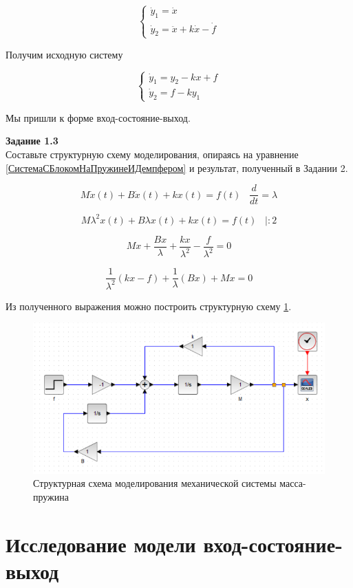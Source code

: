 \documentclass[a4paper, 12pt]{article}
\begin{document}
$$ \begin{cases}
\dot y_1 = \dot{x} \\
\dot y_2 = \ddot{x} + k \dot x - \dot f 
\end{cases} $$

Получим исходную систему

$$ \begin{cases}
\dot y_1 = y_2 - kx + f \\
\dot y_2 = f - ky_1 
\end{cases} $$

Мы пришли к форме вход-состояние-выход.

\textbf{Задание 1.3 } \\
Составьте структурную схему моделирования, опираясь на уравнение \ref{СистемаСБлокомНаПружинеИДемпфером} и результат, полученный в Задании 2.

$$M\dot{x}(t) + B\dot{x}(t) + kx(t) = f(t) \; \; \; \frac{d}{dt} = \lambda $$

$$ M\lambda^2x(t) + B\lambda x(t) + kx(t) = f(t) \; \; \; |:2 $$

$$ Mx + \frac{Bx}{\lambda} + \frac{kx}{\lambda^2} - \frac{f}{\lambda^2} = 0 $$

$$ \frac{1}{\lambda^2}(kx-f) + \frac{1}{\lambda}(Bx) + Mx = 0 $$

Из полученного выражения можно построить структурную схему \ref{p:Схема1}.

\begin{figure}[h!]
	\centering
	\includegraphics[scale=1]{scheme1}
	\caption{Структурная схема моделирования механической системы масса-пружина }
	\label{p:Схема1}
\end{figure}

\newpage
\section{Исследование модели вход-состояние-выход}
\end{document}
